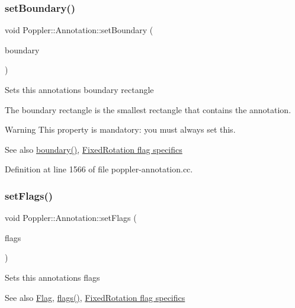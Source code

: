 \subsubsection{\texorpdfstring{set\+Boundary()}{setBoundary()}}
{\footnotesize\ttfamily void Poppler\+::\+Annotation\+::set\+Boundary (\begin{DoxyParamCaption}\item[{const Q\+RectF \&}]{boundary }\end{DoxyParamCaption})}

Sets this annotation\textquotesingle{}s boundary rectangle

The boundary rectangle is the smallest rectangle that contains the annotation.

\begin{DoxyWarning}{Warning}
This property is mandatory\+: you must always set this.
\end{DoxyWarning}
\begin{DoxySeeAlso}{See also}
\hyperlink{class_poppler_1_1_annotation_a659d9288f67ff988f75df0fa9d3ca2fb}{boundary()}, \hyperlink{class_poppler_1_1_annotation_annotFixedRotation}{Fixed\+Rotation flag specifics} 
\end{DoxySeeAlso}


Definition at line 1566 of file poppler-\/annotation.\+cc.

\mbox{\label{class_poppler_1_1_annotation_abb788875ed4ed5e593e979afc70555db}} 
\subsubsection{\texorpdfstring{set\+Flags()}{setFlags()}}
{\footnotesize\ttfamily void Poppler\+::\+Annotation\+::set\+Flags (\begin{DoxyParamCaption}\item[{int}]{flags }\end{DoxyParamCaption})}

Sets this annotation\textquotesingle{}s flags

\begin{DoxySeeAlso}{See also}
\hyperlink{class_poppler_1_1_annotation_a8c2dca956649e4ce454361d5b75dc270}{Flag}, \hyperlink{class_poppler_1_1_annotation_a34a97344409f4ebb1fa9e26d5bc19c71}{flags()}, \hyperlink{class_poppler_1_1_annotation_annotFixedRotation}{Fixed\+Rotation flag specifics} 
\end{DoxySeeAlso}


